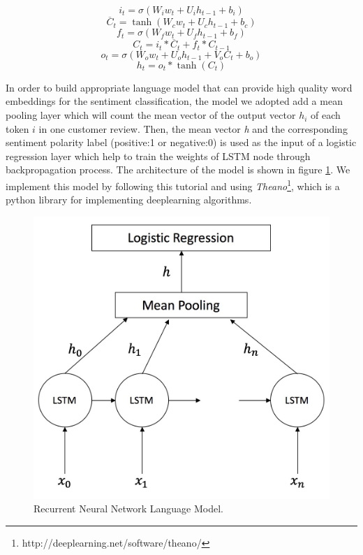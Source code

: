 \documentclass{article}
\begin{document}
$$i_{t}=\sigma(W_{i}w_{t}+U_{i}h_{t-1}+b_{i})$$
$$\overline {C}_{t}=\tanh(W_{c}w_{t}+U_{c}h_{t-1}+b_{c})$$
$$f_{t}=\sigma(W_{f}w_{t}+U_{f}h_{t-1}+b_{f})$$
$$C_{t}=i_{t}\ast \overline {C}_{t} + f_{t} \ast C_{t-1}$$
$$o_{t}=\sigma(W_{o}w_{t}+U_{o}h_{t-1}+V_{o}C_{t}+b_{o})$$
$$h_{t}=o_{t} \ast \tanh(C_{t})$$
 
In order to build appropriate language model that can provide high quality word embeddings for the sentiment classification, the model we adopted add a mean pooling layer which will count the mean vector of the output vector $h_{i}$ of each token $i$ in one customer review. Then, the mean vector \textit{h} and the corresponding sentiment polarity label (positive:1 or negative:0) is used as the input of a logistic regression layer which help to train the weights of LSTM node through backpropagation process. The architecture of the model is shown in figure \ref{fig:lstmmodel}. We implement this model by following this tutorial \cite{lstmtutorial} and using \textit{Theano}\footnote{http://deeplearning.net/software/theano/}, which is a python library for implementing deeplearning algorithms.

\begin{figure}[htb]
\centering
\includegraphics[scale=0.2]{LSTMMODEL.png}
\caption{Recurrent Neural Network Language Model.}
\label{fig:lstmmodel}
\end{figure}
\end{document}
